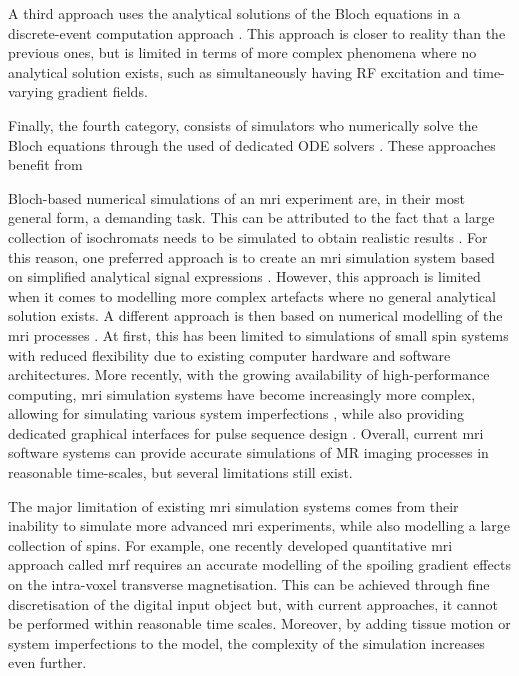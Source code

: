 \hfill

A third approach uses the analytical solutions of the Bloch equations in a discrete-event computation approach \cite{Bittoun1984} \cite{Kwan1999} \cite{Yoder2004} \cite{Drobnjak2006} \cite{Jochimsen2006} \cite{Liu2017}.
This approach is closer to reality than the previous ones, but is limited in terms of more complex phenomena where no analytical solution exists, such as simultaneously having RF excitation and time-varying gradient fields.

\hfill

Finally, the fourth category, consists of simulators who numerically solve the Bloch equations through the used of dedicated ODE solvers \cite{Stocker2010} \cite{Fortin2016}.
These approaches benefit from 

\hfill

Bloch-based numerical simulations of an \ac{mri} experiment are, in their most general form, a demanding task.
This can be attributed to the fact that a large collection of isochromats needs to be simulated to obtain realistic results \cite{Shkarin1997}. 
For this reason, one preferred approach is to create an \ac{mri} simulation system based on simplified analytical signal expressions \cite{Hacklander2005} \cite{Torheim1994} \cite{Yoder2004}.
However, this approach is limited when it comes to modelling more complex artefacts 
where no general analytical solution exists.
A different approach is then based on numerical modelling of the \ac{mri} processes \cite{Summers1986} \cite{Olsson1995}.
At first, this has been limited to simulations of small spin systems with reduced flexibility due to existing computer hardware and software architectures.
More recently, with the growing availability of high-performance computing, \ac{mri} simulation systems have become increasingly more complex, allowing for simulating various system imperfections \cite{Benoit-Cattin2005} \cite{Drobnjak2006}, while also providing dedicated graphical interfaces for pulse sequence design \cite{Stocker2010}.
Overall, current \ac{mri} software systems can provide accurate simulations of MR imaging processes in reasonable time-scales, but several limitations still exist.

\hfill

The major limitation of existing \ac{mri} simulation systems comes from their inability to simulate more advanced \ac{mri} experiments, while also modelling a large collection of spins.
For example, one recently developed quantitative \ac{mri} approach called \ac{mrf} requires an accurate modelling of the spoiling gradient effects on the intra-voxel transverse magnetisation.
This can be achieved through fine discretisation of the digital input object but, with current approaches, it cannot be performed within reasonable time scales.
Moreover, by adding tissue motion or system imperfections to the model, the complexity of the simulation increases even further.

